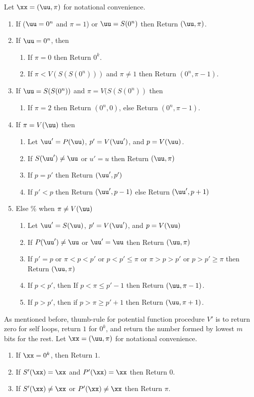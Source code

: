  Let $\xx=(\uu,\pi)$ for notational convenience.
\begin{enumerate}
\item If ($\uu=0^n$ and $\pi=1$) or $\uu=S(0^n)$ then Return $(\uu,\pi)$. 
\item If $\uu=0^n$, then 
\begin{enumerate}
\item If $\pi=0$ then Return $0^k$.
\item If $\pi<V(S(S(0^n)))$ and $\pi\neq 1$ then Return $(0^n,\pi-1)$.
\end{enumerate}
\item If $\uu=S(S(0^n))$ and $\pi=V(S(S(0^n))$ then 
\begin{enumerate}
\item If $\pi=2$ then Return $(0^n,0)$, else Return $(0^n,\pi-1)$. 
\end{enumerate}
\item If $\pi=V(\uu)$ then 
\begin{enumerate}
\item Let $\uu'=P(\uu)$, $p'=V(\uu')$, and $p=V(\uu)$. 
\item If $S(\uu')\neq \uu$ or $u'=u$ then Return $(\uu,\pi)$
\item If $p=p'$ then Return $(\uu',p')$ 
\item If $p'<p$ then Return $(\uu',p-1)$ else Return $(\uu',p+1)$
\end{enumerate}
\item Else \% when $\pi \neq V(\uu)$
\begin{enumerate}
\item Let $\uu'=S(\uu)$, $p'=V(\uu')$, and $p=V(\uu)$
\item If $P(\uu')\neq \uu$ or $\uu'=\uu$ then Return $(\uu,\pi)$
\item If $p'=p$ or $\pi<p< p'$ or $p<p'\le \pi$ or $\pi>p> p'$ or $p>p'\ge \pi$ then Return $(\uu,\pi)$
\item If $p<p'$, then If $p<\pi\le p'-1$ then Return $(\uu,\pi-1)$. 
\item If $p>p'$, then if $p> \pi\ge p'+1$ then Return $(\uu,\pi+1)$. 
\end{enumerate}
\end{enumerate}

As mentioned before, thumb-rule for potential function procedure $V'$ is to return zero for self loops, return $1$ for $0^k$, and return the number formed by lowest $m$ bits for the rest. 
 Let $\xx=(\uu,\pi)$ for notational convenience.
\begin{enumerate}
\item If $\xx=0^k$, then Return $1$. 
\item If $S'(\xx) = \xx$ and $P'(\xx)=\xx$ then Return $0$.
\item If $S'(\xx) \neq \xx$ or $P'(\xx)\neq \xx$ then Return $\pi$.
\end{enumerate}

